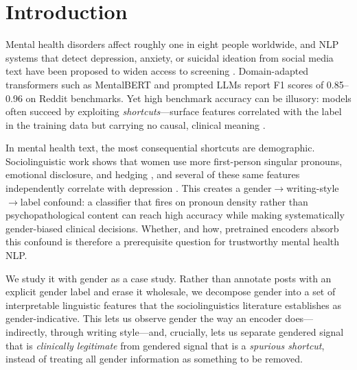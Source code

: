 \documentclass[11pt]{article}
\begin{document}
\section{Introduction}

Mental health disorders affect roughly one in eight people worldwide, and NLP systems that detect depression, anxiety, or suicidal ideation from social media text have been proposed to widen access to screening \citep{coppersmith,cohan}. Domain-adapted transformers such as MentalBERT \citep{ji2022mentalbert} and prompted LLMs \citep{xu2024mentalllm,mankarious} report F1 scores of 0.85--0.96 on Reddit benchmarks. Yet high benchmark accuracy can be illusory: models often succeed by exploiting \emph{shortcuts}---surface features correlated with the label in the training data but carrying no causal, clinical meaning \citep{geirhos2020shortcut,mccoy2019right,du2023shortcut}.

In mental health text, the most consequential shortcuts are demographic. Sociolinguistic work shows that women use more first-person singular pronouns, emotional disclosure, and hedging \citep{newman2008gender,schwartz2013personality}, and several of these same features independently correlate with depression \citep{rude2004language}. This creates a gender$\to$writing-style$\to$label confound: a classifier that fires on pronoun density rather than psychopathological content can reach high accuracy while making systematically gender-biased clinical decisions. Whether, and how, pretrained encoders absorb this confound is therefore a prerequisite question for trustworthy mental health NLP.

We study it with gender as a case study. Rather than annotate posts with an explicit gender label and erase it wholesale, we decompose gender into a set of interpretable linguistic features that the sociolinguistics literature establishes as gender-indicative. This lets us observe gender the way an encoder does---indirectly, through writing style---and, crucially, lets us separate gendered signal that is \emph{clinically legitimate} from gendered signal that is a \emph{spurious shortcut}, instead of treating all gender information as something to be removed.
\end{document}
